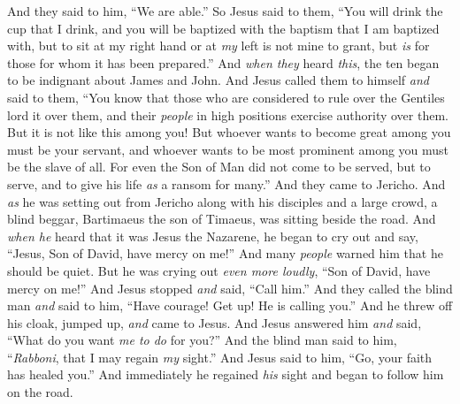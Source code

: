 \begin{biblechapter}
\verse And they said to him, “We are able.” So Jesus said to them, “You will drink the cup that I drink, and you will be baptized with the baptism that I am baptized with,
\verse but to sit at my right hand or at \textit{my} left is not mine to grant, but \textit{is} for those for whom it has been prepared.”
\verse And \textit{when they} heard \textit{this}, the ten began to be indignant about James and John.
\verse And Jesus called them to himself \textit{and} said to them, “You know that those who are considered to rule over the Gentiles lord it over them, and their \textit{people} in high positions exercise authority over them.
\verse But it is not like this among you! But whoever wants to become great among you must be your servant,
\verse and whoever wants to be most prominent among you must be the slave of all.
\verse For even the Son of Man did not come to be served, but to serve, and to give his life \textit{as} a ransom for many.”
 And they came to Jericho. And \textit{as} he was setting out from Jericho along with his disciples and a large crowd, a blind beggar, Bartimaeus the son of Timaeus, was sitting beside the road.
\verse And \textit{when he} heard that it was Jesus the Nazarene, he began to cry out and say, “Jesus, Son of David, have mercy on me!”
\verse And many \textit{people} warned him that he should be quiet. But he was crying out \textit{even more loudly}, “Son of David, have mercy on me!”
\verse And Jesus stopped \textit{and} said, “Call him.” And they called the blind man \textit{and} said to him, “Have courage! Get up! He is calling you.”
\verse And he threw off his cloak, jumped up, \textit{and} came to Jesus.
\verse And Jesus answered him \textit{and} said, “What do you want \textit{me to do} for you?” And the blind man said to him, “\textit{Rabboni}, that I may regain \textit{my} sight.”
\verse And Jesus said to him, “Go, your faith has healed you.” And immediately he regained \textit{his} sight and began to follow him on the road.
\end{biblechapter}

